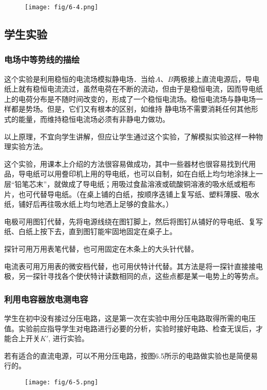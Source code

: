 \begin{figure}[htp]
    \centering
   \texttt{[image: fig/6-4.png]}
    \caption{}
\end{figure}

\subsection{学生实验}
\subsubsection{电场中等势线的描绘}

这个实验是利用稳恒的电流场模拟静电场．当给$A$、$B$两极接上直流电源后，导电纸上就有稳恒电流流过，虽然电荷在不断的流动，但由于是稳恒电流，因而导电纸上的电荷分布是不随时间改变的，形成了一个稳恒电流场。稳恒电流场与静电场一样都是势场。但是，它们又有根本的区别，如维持
静电场不需要消耗任何其他形式的能量，而维持稳恒电流场必须有非静电力做功。

以上原理，不宜向学生讲解，但应让学生通过这个实验，了解模拟实验这样一种物理实验方法。

这个实验，用课本上介绍的方法很容易做成功，其中一些器材也很容易找到代用品，导电纸可以用誊印机上用的导电纸，也可以自制，如在白纸上均匀地涂抹上一层“铅笔芯末”，就做成了导电纸；用吸过食盐溶液或硫酸铜溶液的吸水纸或粗布片，也可代替导电纸。（在桌上铺的白纸，按顺序迭铺上复写纸、塑料薄膜、吸水纸，铺好后再往吸水纸上均匀地洒上足够的食盐水。）

电极可用图钉代替，先将电源线绕在图钉脚上，然后将图钉从铺好的导电纸、复写纸、白纸上按下去，直到图钉能牢固地固定在桌子上。

探针可用万用表笔代替，也可用固定在木条上的大头针代替。

电流表可用万用表的微安档代替，也可用伏特计代替。其方法是将一探针直接接电极，另一探针寻找各个使伏特计读数相同的点，这些点都是某一电势上的等势点。

\subsubsection{利用电容器放电测电容}

学生在初中没有接过分压电路，这是第一次在实验中用分压电路取得所需的电压值。实验前应指导学生对电路进行必要的分析，实验时接好电路、检查无误后，才能合上开关$K'$, 进行实验。

若有适合的直流电源，可以不用分压电路，按图6.5所示的电路做实验也是简便易行的。

\begin{figure}[htp]
    \centering
    \texttt{[image: fig/6-5.png]}
    \caption{}
\end{figure}

